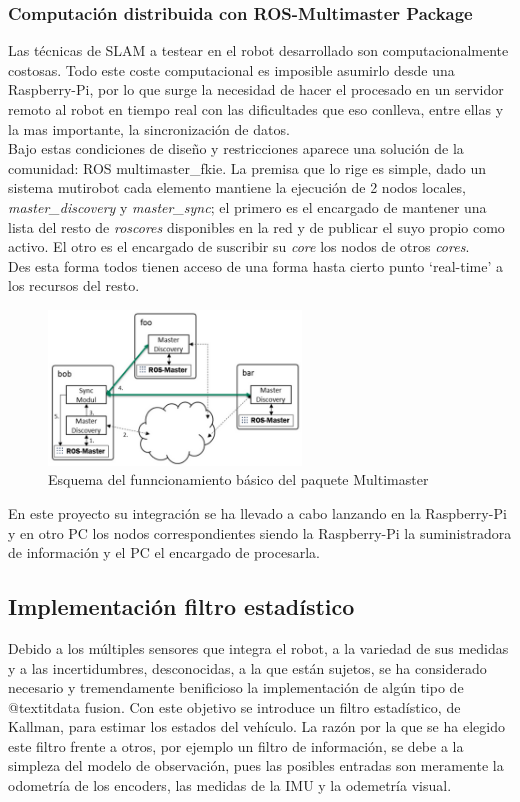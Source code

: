 \subsubsection{Computación distribuida con ROS-Multimaster Package}
Las técnicas de SLAM a testear en el robot desarrollado son computacionalmente costosas. Todo este coste computacional es
imposible asumirlo desde una Raspberry-Pi, por lo que surge la necesidad de hacer el procesado en un servidor remoto al robot en tiempo real con las 
dificultades que eso conlleva, entre ellas y la mas importante, la sincronización de datos.\\
Bajo estas condiciones de diseño y restricciones aparece una solución de la comunidad: ROS multimaster\_fkie. La premisa que lo rige es simple, dado un sistema mutirobot
cada elemento mantiene la ejecución de 2 nodos locales, \textit{master\_discovery} y \textit{master\_sync}; el primero es el encargado de mantener una lista del resto 
de \textit{roscores} disponibles en la red y de publicar el suyo propio como activo. El otro es el encargado de suscribir su \textit{core} los nodos de otros \textit{cores}.\\
Des esta forma todos tienen acceso de una forma hasta cierto punto `real-time' a los recursos del resto. 
\begin{figure}[!ht]
    \centering
    \includegraphics[width=0.6\textwidth]{images/ros_multimaster.png}
    \caption{Esquema del funncionamiento básico del paquete Multimaster}
\end{figure}

En este proyecto su integración se ha llevado a cabo lanzando en la Raspberry-Pi y en otro PC los nodos correspondientes siendo la Raspberry-Pi la 
suministradora de información y el PC el encargado de procesarla.

\subsection{Implementación filtro estadístico}
Debido a los múltiples sensores que integra el robot, a la variedad de sus medidas y a las incertidumbres, desconocidas, a la que están sujetos, se ha considerado necesario y tremendamente benificioso la implementación de algún tipo de @textit{data fusion}. Con este objetivo se introduce un filtro estadístico, de Kallman, para estimar los estados del vehículo. La razón por la que se ha elegido este filtro frente a otros, por ejemplo un filtro de información, se debe a la simpleza del modelo de observación, pues las posibles entradas son meramente la odometría de los encoders, las medidas de la IMU y la odemetría visual.

